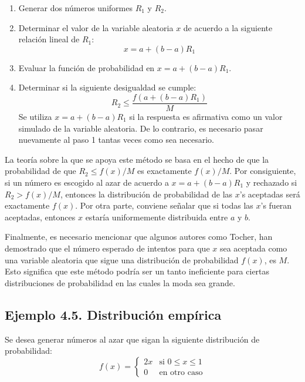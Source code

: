 \documentclass[11pt,letterpaper]{report}
\begin{document}
\begin{enumerate}
    \item Generar dos números uniformes $R_1$ y $R_2$.
    \item Determinar el valor de la variable aleatoria $x$ de acuerdo a la siguiente relación lineal de $R_1$:
    \begin{equation}
    x = a + (b - a)R_1
    \end{equation}
    \item Evaluar la función de probabilidad en $x = a + (b - a)R_1$.
    \item Determinar si la siguiente desigualdad se cumple:
    \begin{equation}
    R_2 \le \frac{f(a + (b - a)R_1)}{M}
    \end{equation}
    Se utiliza $x = a + (b - a)R_1$ si la respuesta es afirmativa como un valor simulado de la variable aleatoria. De lo contrario, es necesario pasar nuevamente al paso 1 tantas veces como sea necesario.
\end{enumerate}

La teoría sobre la que se apoya este método se basa en el hecho de que la probabilidad de que $R_2 \le f(x)/M$ es exactamente $f(x)/M$. Por consiguiente, si un número es escogido al azar de acuerdo a $x = a + (b - a)R_1$ y rechazado si $R_2 > f(x)/M$, entonces la distribución de probabilidad de las $x$'s aceptadas será exactamente $f(x)$. Por otra parte, conviene señalar que si todas las $x$'s fueran aceptadas, entonces $x$ estaría uniformemente distribuida entre $a$ y $b$.

Finalmente, es necesario mencionar que algunos autores como Tocher, han demostrado que el número esperado de intentos para que $x$ sea aceptada como una variable aleatoria que sigue una distribución de probabilidad $f(x)$, es $M$. Esto significa que este método podría ser un tanto ineficiente para ciertas distribuciones de probabilidad en las cuales la moda sea grande.

\subsection*{Ejemplo 4.5. Distribución empírica}
Se desea generar números al azar que sigan la siguiente distribución de probabilidad:
\begin{equation}
f(x) = \begin{cases} 
2x & \text{si } 0 \le x \le 1 \\ 
0 & \text{en otro caso} 
\end{cases}
\end{equation}
\end{document}
